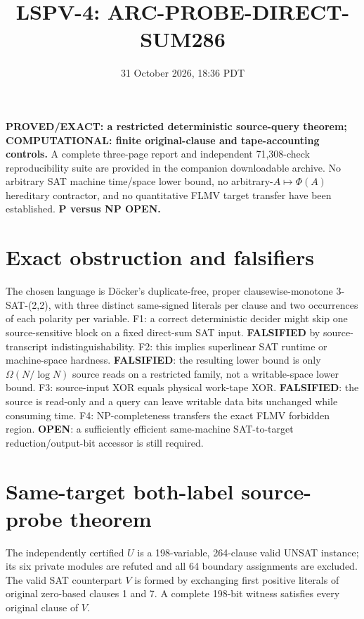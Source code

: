 \documentclass[11pt]{article}
\title{LSPV-4: ARC-PROBE-DIRECT-SUM286}
\date{31 October 2026, 18:36 PDT}
\begin{document}
\maketitle
\noindent\textbf{PROVED/EXACT: a restricted deterministic source-query theorem;
COMPUTATIONAL: finite original-clause and tape-accounting controls.}
A complete three-page report and independent 71,308-check reproducibility
suite are provided in the companion downloadable archive. No arbitrary
SAT machine time/space lower bound, no arbitrary-$A\mapsto\Phi(A)$ hereditary
contractor, and no quantitative FLMV target transfer have been established.
\textbf{P versus NP OPEN.}

\section{Exact obstruction and falsifiers}
The chosen language is D\"ocker's duplicate-free, proper clausewise-monotone
3-SAT-(2,2), with three distinct same-signed literals per clause and two
occurrences of each polarity per variable. F1: a correct deterministic
decider might skip one source-sensitive block on a fixed direct-sum SAT
input. \textbf{FALSIFIED} by source-transcript indistinguishability.
F2: this implies superlinear SAT runtime or machine-space hardness.
\textbf{FALSIFIED}: the resulting lower bound is only $\Omega(N/\log N)$
source reads on a restricted family, not a writable-space lower bound.
F3: source-input XOR equals physical work-tape XOR.
\textbf{FALSIFIED}: the source is read-only and a query can leave writable
data bits unchanged while consuming time. F4: NP-completeness transfers
the exact FLMV forbidden region. \textbf{OPEN}: a sufficiently efficient
same-machine SAT-to-target reduction/output-bit accessor is still required.

\section{Same-target both-label source-probe theorem}
The independently certified $U$ is a 198-variable, 264-clause valid
UNSAT instance; its six private modules are refuted and all 64 boundary
assignments are excluded. The valid SAT counterpart $V$ is formed by
exchanging first positive literals of original zero-based clauses 1 and 7.
A complete 198-bit witness satisfies every original clause of $V$.
\end{document}

